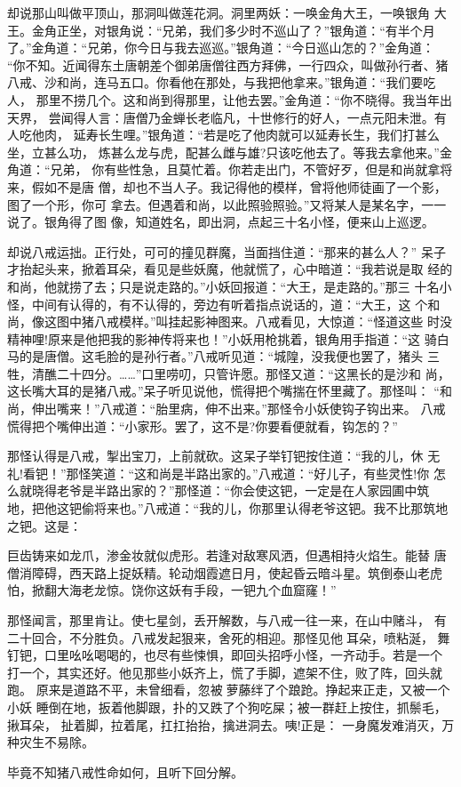 却说那山叫做平顶山，那洞叫做莲花洞。洞里两妖：一唤金角大王，一唤银角
大王。金角正坐，对银角说：“兄弟，我们多少时不巡山了？”银角道：“有半个月
了。”金角道：“兄弟，你今日与我去巡巡。”银角道：“今日巡山怎的？”金角道：
“你不知。近闻得东土唐朝差个御弟唐僧往西方拜佛，一行四众，叫做孙行者、猪
八戒、沙和尚，连马五口。你看他在那处，与我把他拿来。”银角道：“我们要吃人，
那里不捞几个。这和尚到得那里，让他去罢。”金角道：“你不晓得。我当年出天界，
尝闻得人言：唐僧乃金蝉长老临凡，十世修行的好人，一点元阳未泄。有人吃他肉，
延寿长生哩。”银角道：“若是吃了他肉就可以延寿长生，我们打甚么坐，立甚么功，
炼甚么龙与虎，配甚么雌与雄?只该吃他去了。等我去拿他来。”金角道：“兄弟，
你有些性急，且莫忙着。你若走出门，不管好歹，但是和尚就拿将来，假如不是唐
僧，却也不当人子。我记得他的模样，曾将他师徒画了一个影，图了一个形，你可
拿去。但遇着和尚，以此照验照验。”又将某人是某名字，一一说了。银角得了图
像，知道姓名，即出洞，点起三十名小怪，便来山上巡逻。

却说八戒运拙。正行处，可可的撞见群魔，当面挡住道：“那来的甚么人？”
呆子才抬起头来，掀着耳朵，看见是些妖魔，他就慌了，心中暗道：“我若说是取
经的和尚，他就捞了去；只是说走路的。”小妖回报道：“大王，是走路的。”那三
十名小怪，中间有认得的，有不认得的，旁边有听着指点说话的，道：“大王，这
个和尚，像这图中猪八戒模样。”叫挂起影神图来。八戒看见，大惊道：“怪道这些
时没精神哩!原来是他把我的影神传将来也！”小妖用枪挑着，银角用手指道：“这
骑白马的是唐僧。这毛脸的是孙行者。”八戒听见道：“城隍，没我便也罢了，猪头
三牲，清醮二十四分。……”口里唠叨，只管许愿。那怪又道：“这黑长的是沙和
尚，这长嘴大耳的是猪八戒。”呆子听见说他，慌得把个嘴揣在怀里藏了。那怪叫：
“和尚，伸出嘴来！”八戒道：“胎里病，伸不出来。”那怪令小妖使钩子钩出来。
八戒慌得把个嘴伸出道：“小家形。罢了，这不是?你要看便就看，钩怎的？”

那怪认得是八戒，掣出宝刀，上前就砍。这呆子举钉钯按住道：“我的儿，休
无礼!看钯！”那怪笑道：“这和尚是半路出家的。”八戒道：“好儿子，有些灵性!你
怎么就晓得老爷是半路出家的？”那怪道：“你会使这钯，一定是在人家园圃中筑
地，把他这钯偷将来也。”八戒道：“我的儿，你那里认得老爷这钯。我不比那筑地
之钯。这是：

巨齿铸来如龙爪，渗金妆就似虎形。若逢对敌寒风洒，但遇相持火焰生。能替
唐僧消障碍，西天路上捉妖精。轮动烟霞遮日月，使起昏云暗斗星。筑倒泰山老虎
怕，掀翻大海老龙惊。饶你这妖有手段，一钯九个血窟窿！”

那怪闻言，那里肯让。使七星剑，丢开解数，与八戒一往一来，在山中赌斗，
有二十回合，不分胜负。八戒发起狠来，舍死的相迎。那怪见他耳朵，喷粘涎，
舞钉钯，口里吆吆喝喝的，也尽有些悚惧，即回头招呼小怪，一齐动手。若是一个
打一个，其实还好。他见那些小妖齐上，慌了手脚，遮架不住，败了阵，回头就跑。
原来是道路不平，未曾细看，忽被萝藤绊了个踉跄。挣起来正走，又被一个小妖
睡倒在地，扳着他脚跟，扑的又跌了个狗吃屎；被一群赶上按住，抓鬃毛，揪耳朵，
扯着脚，拉着尾，扛扛抬抬，擒进洞去。咦!正是：
一身魔发难消灭，万种灾生不易除。

毕竟不知猪八戒性命如何，且听下回分解。